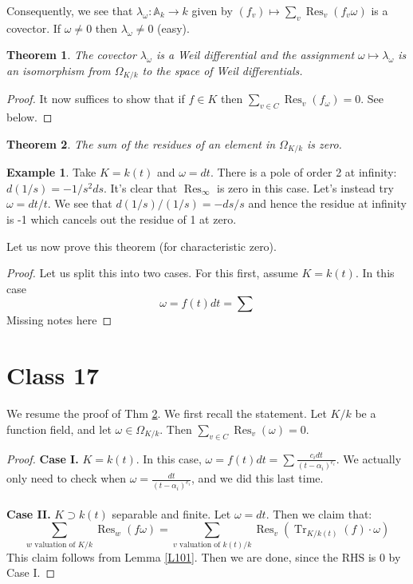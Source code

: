 \documentclass{article}
\DeclareMathOperator{\Tr}{Tr}
\DeclareMathOperator{\Res}{Res}
\DeclareMathOperator{\res}{Res}
\theoremstyle{plain}
\newtheorem{thm}{Theorem}
\theoremstyle{definition}
\newtheorem{exmp}{Example}
\theoremstyle{remark}
\begin{document}
Consequently, we see that $\lambda_\omega:\mathbb{A}_k\to k$ given by $(f_v)\mapsto \sum_v\res_v(f_v\omega)$ is a covector. If $\omega\neq 0$ then $\lambda_\omega\neq 0$ (easy).

\begin{thm}
\label{L99}
The covector $\lambda_\omega$ is a Weil differential and the assignment $\omega\mapsto\lambda_\omega$ is an isomorphism from $\Omega_{K/k}$ to the space of Weil differentials.
\end{thm}
\begin{proof}
It now suffices to show that if $f\in K$ then $\sum_{v\in C}\res_v(f_\omega)=0$. See below.
\end{proof}

\begin{thm}
\label{L100}
The sum of the residues of an element in $\Omega_{K/k}$ is zero. 
\end{thm}

\begin{exmp}
Take $K=k(t)$ and $\omega=dt$. There is a pole of order 2 at infinity: $d(1/s)=-1/s^2 ds$. It's clear that $\res_\infty$ is zero in this case.
Let's instead try $\omega=dt/t$. We see that $d(1/s)/(1/s)=-ds/s$ and hence the residue at infinity is -1 which cancels out the residue of 1 at zero.
\end{exmp}

Let us now prove this theorem (for characteristic zero).
\begin{proof}
Let us split this into two cases. For this first, assume $K=k(t)$. In this case
\[\omega=f(t)dt=\sum\]
Missing notes here
\end{proof}


\section*{Class 17}
We resume the proof of Thm \ref{L100}. We first recall the statement. Let $K/k$ be a function field, and let $\omega \in \Omega_{K/k}$. Then $\sum_{v\in C} \Res_v(\omega) = 0$.
\begin{proof}
\textbf{Case I.} $K = k(t)$. In this case, $\omega = f(t) dt = \sum \frac{c_i dt}{(t-\alpha_i)^{e_i}}$. We actually only need to check when $\omega = \frac{dt}{(t-\alpha_i)^{e_i}}$, and we did this last time. 
\\
\\
\textbf{Case II.} $K \supset k(t)$ separable and finite. Let $\omega = dt$. Then we claim that:
\[       \sum_{w \text{ valuation of } K/k} \Res_w(f\omega) = \sum_{v \text{ valuation of } k(t)/k} \Res_v (\Tr_{K/k(t)} (f) \cdot \omega)     \]
This claim follows from Lemma \ref{L101}. Then we are done, since the RHS is 0 by Case I.
\end{proof}
\end{document}
